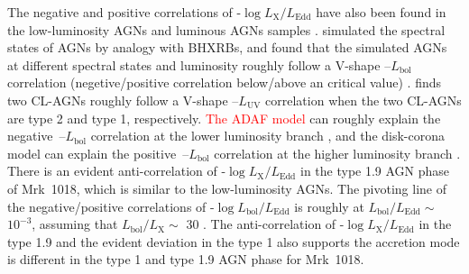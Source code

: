 The negative and positive correlations of \alphaox-$\log{L_\mathrm{X}/L_\mathrm{Edd}}$ have also been found in the low-luminosity AGNs\citep[e.g.][]{2011ApJ...739...64X,2017MNRAS.471.2848L} and luminous AGNs samples \citep[e.g.][]{2010A&A...512A..34L, 2013A&A...550A..71V,2016ApJ...819..154L}. \citet{2011MNRAS.413.2259S} simulated the spectral states of AGNs by analogy with BHXRBs, and found that the simulated AGNs at different spectral states and luminosity roughly follow a V-shape \alphaox--$L_\mathrm{bol}$ correlation (negetive/positive correlation below/above an critical value) \citep[see also in ][]{2019ApJ...883...76R}. \citet{2019arXiv190904676R} finds two CL-AGNs roughly follow a V-shape \alphaox--$L_\mathrm{UV}$ correlation when the two CL-AGNs are type 2 and type 1, respectively. \textcolor{red}{The ADAF model} can roughly explain the negative \alphaox\,--$L_\mathrm{bol}$ correlation at the lower luminosity branch \citep{2011ApJ...739...64X,2017MNRAS.471.2848L}, and the disk-corona model can explain the positive \alphaox\,--$L_\mathrm{bol}$ correlation at the higher luminosity branch \citep{2017A&A...602A..79L, 2018MNRAS.480.1247K,2019A&A...628A.135A}. There is an evident anti-correlation of \alphaox-$\log{L_\mathrm{X}/L_\mathrm{Edd}}$ in the type 1.9 AGN phase of Mrk~1018, which is similar to the low-luminosity AGNs. The pivoting line of the negative/positive correlations of \alphaox-$\log{L_\mathrm{bol}/L_\mathrm{Edd}}$ is roughly at $L_\mathrm{bol}/L_\mathrm{Edd} \sim$ $10^{-3}$, assuming that $L_\mathrm{bol}/L_\mathrm{X} \sim$ $30$ \citep[see][]{2011ApJ...739...64X,2017MNRAS.471.2848L}.  The anti-correlation of \alphaox-$\log{L_\mathrm{X}/L_\mathrm{Edd}}$ in the type 1.9 and the evident deviation in the type 1 also supports the accretion mode is different in the type 1 and type 1.9 AGN phase for Mrk~1018.     


